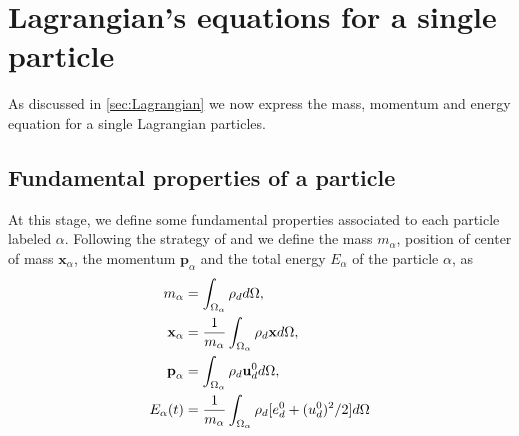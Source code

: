\section{Lagrangian's equations for a single particle}
\label{ap:particles_eq}

As discussed in \ref{sec:Lagrangian} we now express the mass, momentum and energy equation for a single Lagrangian particles. 

\subsection{Fundamental properties of a particle}

At this stage, we define some fundamental properties associated to each particle labeled $\alpha$.
Following the strategy of \citet{lhuillier2009rheology,lhuillier1992volume,zaepffel2011modelisation} and \citet[Chapter 2]{morel2015mathematical}
we define the mass $m_\alpha$, position of center of mass $\mathbf{x}_\alpha$, the momentum $\textbf{p}_\alpha$ and the total energy $E_\alpha$ of the particle $\alpha$, as
\begin{align}
    m_\alpha
    &= \int_{\Omega_{\alpha}}  \rho_d   d\Omega, 
    \\
    \textbf{x}_\alpha
    &= \frac{1}{m_\alpha }\int_{\Omega_{\alpha}}  \rho_d \textbf{x}  d\Omega, 
    \\\textbf{p}_\alpha 
    &= \int_{\Omega_{\alpha}}  \rho_d \textbf{u}_d^0  d\Omega,
    \label{eq:mass_pos}
    \\
    E_\alpha(t) 
    &=\frac{1}{m_\alpha} 
    \int_{\Omega_{\alpha}}  \rho_d [e_d^0 + (u_d^0)^2/2]  d\Omega
\end{align}
